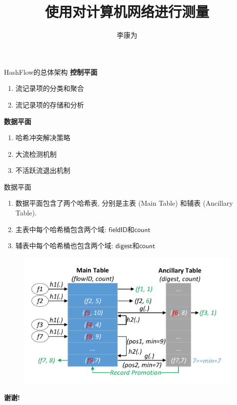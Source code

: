 \documentclass{beamer}
\title{\textbf{使用{\system}对计算机网络进行测量}}
\author{李康为}
\institute{北京大学计算机科学与技术系}
\date{} %
\newcommand{\system}{HashFlow}
\newcommand{\field}{\mathsf}
\begin{document}
{ 
\frame{\titlepage}}



\begin{frame}{{\system}的总体架构}
\textbf{控制平面}
\begin{enumerate}
\item 流记录项的分类和聚合
\item 流记录项的存储和分析
\end{enumerate}

\textbf{数据平面}
\begin{enumerate}
\item 哈希冲突解决策略
\item 大流检测机制
\item 不活跃流退出机制
\end{enumerate}
\end{frame}

\begin{frame}{数据平面}
\begin{enumerate}
\item 数据平面包含了两个哈希表, 分别是主表 (Main Table) 和辅表 (Ancillary Table).
\item 主表中每个哈希桶包含两个域: $\field{fieldID}$和$\field{count}$
\item 辅表中每个哈希桶也包含两个域: $\field{digest}$和$\field{count}$
\end{enumerate}
\begin{figure}
	\centering
	\includegraphics[width=0.6\linewidth]{figures/representation/datastructure}
\end{figure}

\end{frame}

  
\begin{frame}{}
\begin{center}
    \textbf{谢谢!}
\end{center}
\end{frame}
\end{document}
